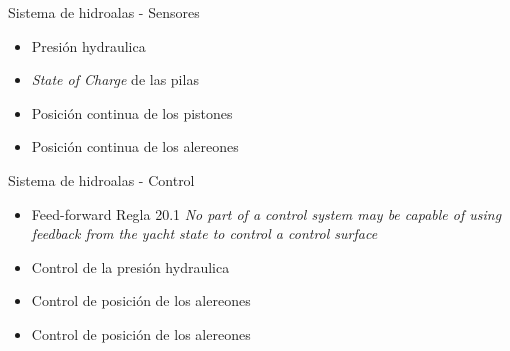 \documentclass[presentation,aspectratio=169]{beamer}
\begin{document}
\begin{frame}[label={sec:org927af33}]{Sistema de hidroalas - Sensores}
\begin{itemize}
\item Presión hydraulica
\item \emph{State of Charge} de las pilas
\item Posición continua de los pistones
\item Posición continua de los alereones
\end{itemize}
\end{frame}



\begin{frame}[label={sec:org00af097}]{Sistema de hidroalas - Control}
\begin{itemize}
\item \alert{Feed-forward} Regla 20.1 \emph{No part of a control system may be capable of using feedback from the yacht state to control a control surface}
\item Control de la presión hydraulica
\item Control de posición de los alereones
\item Control de posición de los alereones
\end{itemize}
\end{frame}
\end{document}
